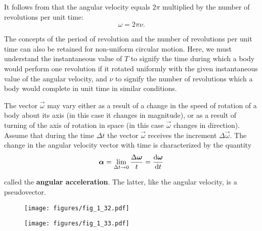 \noindent
It follows from  that the angular velocity equals $2\pi$ multiplied by the number of revolutions per unit time:
\begin{equation}\label{eq:1_97}
\omega = 2\pi\nu.
\end{equation}

The concepts of the period of revolution and the number of revolutions per unit time can also be retained for non-uniform circular motion. Here, we must understand the instantaneous value of $T$ to signify the time during which a body would perform one revolution if it rotated uniformly with the given instantaneous value of the angular velocity, and $\nu$ to signify the number of revolutions which a body would complete in unit time in similar conditions.

The vector $\vec{\omega}$ may vary either as a result of a change in the speed of rotation of a body about its axis (in this case it changes in magnitude), or as a result of turning of the axis of rotation in space (in this case $\vec{\omega}$ changes in direction). Assume that during the time $\Delta t$ the vector $\vec{\omega}$ receives the increment $\Delta\vec{\omega}$. The change in the angular velocity vector with time is characterized by the quantity
\begin{equation}\label{eq:1_98}
\boldsymbol{\alpha} = \lim_{\Delta t\to 0} \frac{\Delta\boldsymbol{\omega}}{t} = \frac{\mathrm{d}\boldsymbol{\omega}}{\mathrm{d} t}
\end{equation}

\noindent
called the \textbf{angular acceleration}. The latter, like the angular velocity, is a pseudovector.

\begin{figure}[t]
	\begin{minipage}[t]{0.5\linewidth}
		\begin{center}
			\texttt{[image: figures/fig\_1\_32.pdf]}
			\caption[]{}
			\label{fig:1_32}
		\end{center}
	\end{minipage}
	\hspace{-0.1cm}
	\begin{minipage}[t]{0.5\linewidth}
		\begin{center}
			\texttt{[image: figures/fig\_1\_33.pdf]}
			\caption[]{}
			\label{fig:1_33}
		\end{center}
	\end{minipage}
	\vspace{-0.6cm}
\end{figure}

